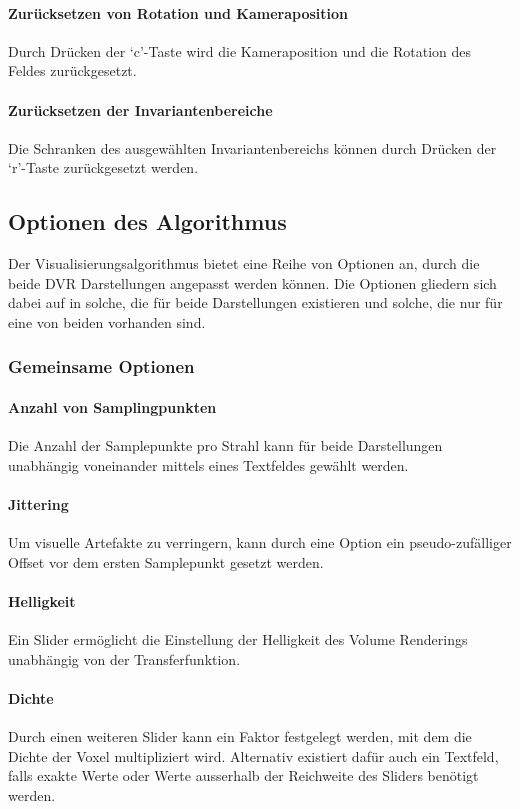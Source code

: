 \documentclass[a4paper,fontsize=12pt,toc=bib,halfparskip]{scrartcl}
\begin{document}
\paragraph{Zur\"ucksetzen von Rotation und Kameraposition}
Durch Dr\"ucken der `c'-Taste wird die Kameraposition und die Rotation des Feldes zur\"uckgesetzt.
\paragraph{Zur\"ucksetzen der Invariantenbereiche}
Die Schranken des ausgew\"ahlten Invariantenbereichs k\"onnen durch Dr\"ucken der `r'-Taste zur\"uckgesetzt werden.

\subsection{Optionen des Algorithmus}
\label{Options}

Der Visualisierungsalgorithmus bietet eine Reihe von Optionen an, durch die beide DVR Darstellungen angepasst werden k\"onnen. Die Optionen gliedern sich dabei auf in solche, die f\"ur beide Darstellungen existieren und solche, die nur f\"ur eine von beiden vorhanden sind. 

\subsubsection{Gemeinsame Optionen}

\paragraph{Anzahl von Samplingpunkten}
Die Anzahl der Samplepunkte pro Strahl kann f\"ur beide Darstellungen unabh\"angig voneinander mittels eines Textfeldes gew\"ahlt werden.

\paragraph{Jittering}
Um visuelle Artefakte zu verringern, kann durch eine Option ein pseudo-zuf\"alliger Offset vor dem ersten Samplepunkt gesetzt werden.

\paragraph{Helligkeit}
Ein Slider erm\"oglicht die Einstellung der Helligkeit des Volume Renderings unabh\"angig von der Transferfunktion.

\paragraph{Dichte}
Durch einen weiteren Slider kann ein Faktor festgelegt werden, mit dem die Dichte der Voxel multipliziert wird. Alternativ existiert daf\"ur auch ein Textfeld, falls exakte Werte oder Werte ausserhalb der Reichweite des Sliders ben\"otigt werden.
\end{document}
